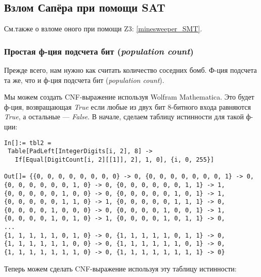 \subsection{Взлом Сапёра при помощи SAT}
\label{minesweeper_SAT}

См.также о взломе оного при помощи Z3: \ref{minesweeper_SMT}.

\subsubsection{Простая ф-ция подсчета бит (\textit{population count})}

Прежде всего, нам нужно как считать количество соседних бомб.
Ф-ция подсчета та же, что и ф-ция подсчета бит (\textit{population count}).

Мы можем создать \ac{CNF}-выражение используя Wolfram Mathematica.
Это будет ф-ция, возвращающая \textit{True} если любые из двух бит 8-битного входа равняются \textit{True},
а остальные --- \textit{False}.
В начале, сделаем таблицу истинности для такой ф-ции:

\begin{lstlisting}
In[]:= tbl2 = 
 Table[PadLeft[IntegerDigits[i, 2], 8] -> 
   If[Equal[DigitCount[i, 2][[1]], 2], 1, 0], {i, 0, 255}]

Out[]= {{0, 0, 0, 0, 0, 0, 0, 0} -> 0, {0, 0, 0, 0, 0, 0, 0, 1} -> 0, 
{0, 0, 0, 0, 0, 0, 1, 0} -> 0, {0, 0, 0, 0, 0, 0, 1, 1} -> 1, 
{0, 0, 0, 0, 0, 1, 0, 0} -> 0, {0, 0, 0, 0, 0, 1, 0, 1} -> 1, 
{0, 0, 0, 0, 0, 1, 1, 0} -> 1, {0, 0, 0, 0, 0, 1, 1, 1} -> 0, 
{0, 0, 0, 0, 1, 0, 0, 0} -> 0, {0, 0, 0, 0, 1, 0, 0, 1} -> 1, 
{0, 0, 0, 0, 1, 0, 1, 0} -> 1, {0, 0, 0, 0, 1, 0, 1, 1} -> 0, 
...
{1, 1, 1, 1, 1, 0, 1, 0} -> 0, {1, 1, 1, 1, 1, 0, 1, 1} -> 0, 
{1, 1, 1, 1, 1, 1, 0, 0} -> 0, {1, 1, 1, 1, 1, 1, 0, 1} -> 0, 
{1, 1, 1, 1, 1, 1, 1, 0} -> 0, {1, 1, 1, 1, 1, 1, 1, 1} -> 0}
\end{lstlisting}

Теперь можем сделать \ac{CNF}-выражение используя эту таблицу истинности:

